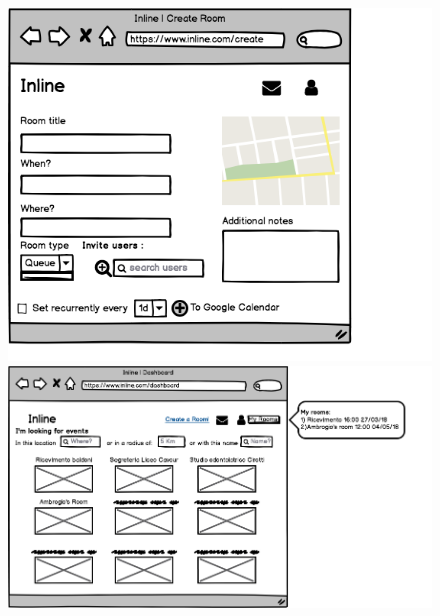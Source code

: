 	\begin{figure}[H]
		\centering
		\begin{minipage}[b]{0.45\textwidth}
			\includegraphics[width=\textwidth]{./Mockup/Createevent.png}
		\end{minipage}
		\hfill
		\begin{minipage}[b]{0.45\textwidth}
			\includegraphics[width=\textwidth]{./Mockup/Dashboard.png}
		\end{minipage}
	\end{figure}

